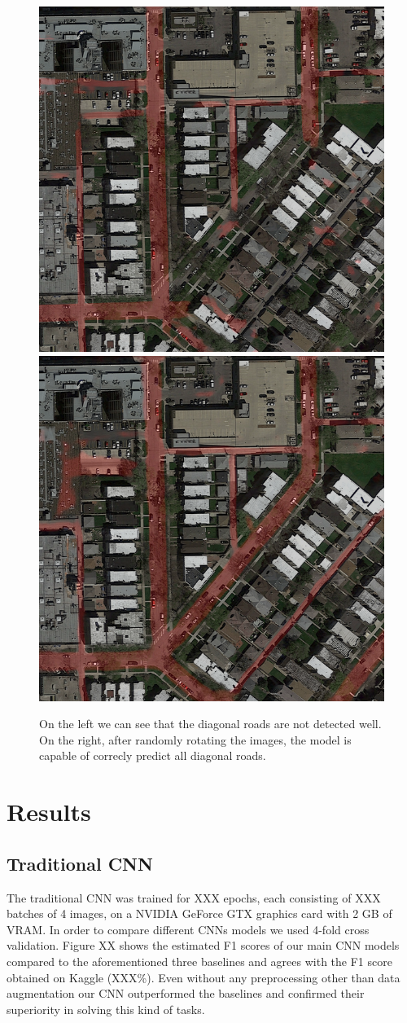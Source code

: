 \documentclass[10pt,conference,compsocconf]{IEEEtran}
\begin{document}
\begin{figure}[h]
 \centering
 \includegraphics[width=0.35\columnwidth]{img/diagonals.png}
 \includegraphics[width=0.35\columnwidth]{img/diagonals_corrected.png}
 \caption{On the left we can see that the diagonal roads are not detected well. On the right, after randomly rotating the images, the model is capable of correcly predict all diagonal roads.}
 \vspace{-3mm}
 \label{fig:diagonal}
\end{figure}

\section{Results}
\label{sec:results}
\subsection{Traditional CNN}
	The traditional CNN was trained for XXX epochs, each consisting of XXX batches of 4 images, on a NVIDIA GeForce GTX graphics card with 2 GB of VRAM. 
	In order to compare different CNNs models we used 4-fold cross validation. Figure XX shows the estimated F1 scores of our main CNN models compared to the aforementioned three baselines and agrees with the F1 score obtained on Kaggle (XXX\%). Even without any preprocessing other than data augmentation our CNN outperformed the baselines and confirmed their superiority in solving this kind of tasks.
\end{document}
